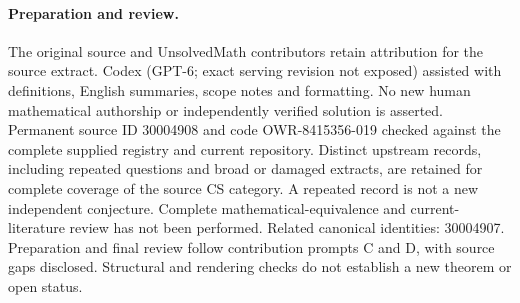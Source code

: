 \documentclass[11pt]{article}
\begin{document}
\paragraph{Preparation and review.}
The original source and UnsolvedMath contributors retain attribution for the source extract. Codex (GPT-6; exact serving revision not exposed) assisted with definitions, English summaries, scope notes and formatting. No new human mathematical authorship or independently verified solution is asserted. Permanent source ID 30004908 and code OWR-8415356-019 checked against the complete supplied registry and current repository. Distinct upstream records, including repeated questions and broad or damaged extracts, are retained for complete coverage of the source CS category. A repeated record is not a new independent conjecture. Complete mathematical-equivalence and current-literature review has not been performed. Related canonical identities: 30004907. Preparation and final review follow contribution prompts C and D, with source gaps disclosed. Structural and rendering checks do not establish a new theorem or open status.
\label{end:30004908}
\end{document}
